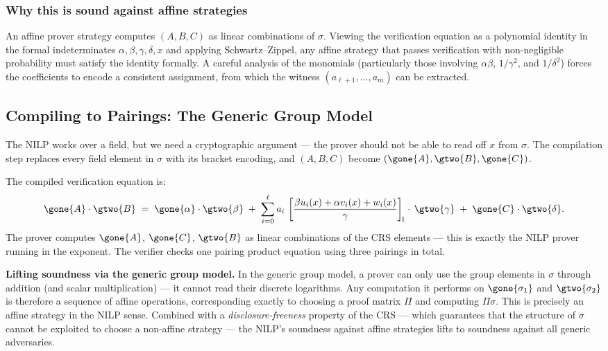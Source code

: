 \subsubsection*{Why this is sound against affine strategies}

An affine prover strategy computes $(A, B, C)$ as linear combinations of $\sigma$. Viewing the verification equation as a polynomial identity in the formal indeterminates $\alpha, \beta, \gamma, \delta, x$ and applying Schwartz--Zippel, any affine strategy that passes verification with non-negligible probability must satisfy the identity formally. A careful analysis of the monomials (particularly those involving $\alpha\beta$, $1/\gamma^2$, and $1/\delta^2$) forces the coefficients to encode a consistent assignment, from which the witness $(a_{\ell+1}, \ldots, a_m)$ can be extracted.


\subsection{Compiling to Pairings: The Generic Group Model}

The NILP works over a field, but we need a cryptographic argument --- the prover should not be able to read off $x$ from $\sigma$. The compilation step replaces every field element in $\sigma$ with its bracket encoding, and $(A, B, C)$ become $(\gone{A}, \gtwo{B}, \gone{C})$.

The compiled verification equation is:
\[
  \gone{A} \cdot \gtwo{B}
  \;=\;
  \gone{\alpha}\cdot\gtwo{\beta}
  \;+\;
  \sum_{i=0}^{\ell} a_i\,
    \left[\frac{\beta u_i(x)+\alpha v_i(x)+w_i(x)}{\gamma}\right]_{\!1}
    \cdot\, \gtwo{\gamma}
  \;+\;
  \gone{C}\cdot\gtwo{\delta}.
\]
The prover computes $\gone{A}$, $\gone{C}$, $\gtwo{B}$ as linear combinations of the CRS elements --- this is exactly the NILP prover running in the exponent. The verifier checks one pairing product equation using three pairings in total.

\textbf{Lifting soundness via the generic group model.} In the generic group model, a prover can only use the group elements in $\sigma$ through addition (and scalar multiplication) --- it cannot read their discrete logarithms. Any computation it performs on $\gone{\sigma_1}$ and $\gtwo{\sigma_2}$ is therefore a sequence of affine operations, corresponding exactly to choosing a proof matrix $\Pi$ and computing $\Pi\sigma$. This is precisely an affine strategy in the NILP sense. Combined with a \emph{disclosure-freeness} property of the CRS --- which guarantees that the structure of $\sigma$ cannot be exploited to choose a non-affine strategy --- the NILP's soundness against affine strategies lifts to soundness against all generic adversaries.

